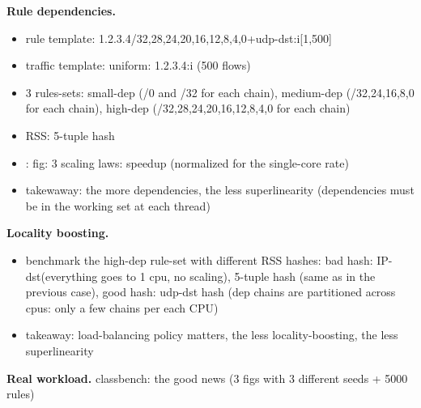 \noindent%
\textbf{Rule dependencies.} %
\begin{itemize}
\item rule template: 1.2.3.4/{32,28,24,20,16,12,8,4,0}+udp-dst:i[1,500]
\item   traffic template: uniform: 1.2.3.4:i (500 flows) 
\item   3 rules-sets: small-dep (/0 and /32 for each chain), medium-dep (/{32,24,16,8,0}  for each chain), high-dep (/{32,28,24,20,16,12,8,4,0}  for each chain)
\item   RSS: 5-tuple hash
\item: fig: 3 scaling laws: speedup (normalized for the single-core rate)
\item takewaway: the more dependencies, the less superlinearity (dependencies must be in the working set at each thread)
\end{itemize}

\noindent%
\textbf{Locality boosting.} %
\begin{itemize}
\item benchmark the high-dep rule-set with different RSS hashes: bad hash: IP-dst(everything goes to 1 cpu, no scaling), 5-tuple hash (same as in the previous case), good hash: udp-dst hash (dep chains are partitioned across cpus: only a few chains per each CPU) 
\item  takeaway: load-balancing policy matters, the less locality-boosting, the less superlinearity
\end{itemize}

\noindent%
\textbf{Real workload.} %
classbench: the good news (3 figs with 3 different seeds + 5000 rules)


